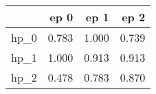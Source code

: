 \begin{tabular}{lrrr}
\toprule
{} &   ep 0 &   ep 1 &   ep 2 \\
\midrule
hp\_0 &  0.783 &  1.000 &  0.739 \\
hp\_1 &  1.000 &  0.913 &  0.913 \\
hp\_2 &  0.478 &  0.783 &  0.870 \\
\bottomrule
\end{tabular}
